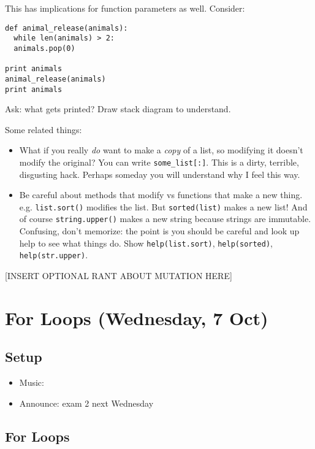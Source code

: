 \documentclass{article}
\begin{document}
This has implications for function parameters as well.  Consider:

\begin{verbatim}
def animal_release(animals):
  while len(animals) > 2:
  animals.pop(0)

print animals
animal_release(animals)
print animals
\end{verbatim}

Ask: what gets printed?  Draw stack diagram to understand.

Some related things:
\begin{itemize}
\item What if you really \emph{do} want to make a \emph{copy} of a
  list, so modifying it doesn't modify the original?  You can write
  \verb|some_list[:]|.  This is a dirty, terrible, disgusting hack.
  Perhaps someday you will understand why I feel this way.
\item Be careful about methods that modify vs functions that make a
  new thing.  e.g. \verb|list.sort()| modifies the list.  But
  \verb|sorted(list)| makes a new list!  And of course
  \verb|string.upper()| makes a new string because strings are
  immutable.  Confusing, don't memorize: the point is you should be
  careful and look up help to see what things do.  Show
  \verb|help(list.sort)|, \verb|help(sorted)|, \verb|help(str.upper)|.
\end{itemize}

[INSERT OPTIONAL RANT ABOUT MUTATION HERE]

\section*{For Loops (Wednesday, 7 Oct)}

\subsection*{Setup}
\begin{itemize}
\item Music:
\item Announce: exam 2 next Wednesday
\end{itemize}

\subsection*{For Loops}
\end{document}
